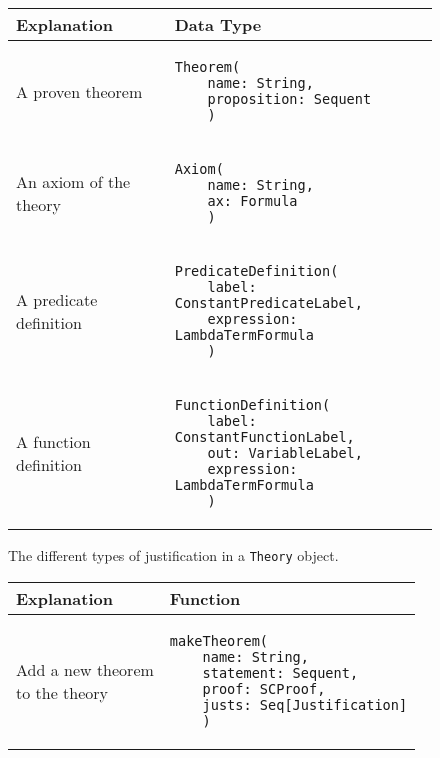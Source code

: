 {
\def\arraystretch{4}

\begin{figure}[hp]
\begin{center}
\begin{tabular}{l|l}
Explanation & Data Type
\\ \hline

A proven theorem & 
\begin{lstlisting}
Theorem(
	name: String,
	proposition: Sequent
	)

\end{lstlisting}
\\ %

An axiom of the theory & 
\begin{lstlisting}
Axiom(
	name: String,
	ax: Formula
	)

\end{lstlisting}
\\ %

A predicate definition & 
\begin{lstlisting}
PredicateDefinition(
	label: ConstantPredicateLabel,
	expression: LambdaTermFormula
	)

\end{lstlisting} 
\\ %

A function definition & 
\begin{lstlisting}
FunctionDefinition(
	label: ConstantFunctionLabel,
	out: VariableLabel,
	expression: LambdaTermFormula
	)

\end{lstlisting}
\\ %

\end{tabular}

\caption{The different types of justification in a \lstinline{Theory}{} object.}
\label{fig:justifications}
\end{center}
\end{figure}

\begin{figure}[hp]
\begin{center}
\begin{tabular}{l|l}
Explanation & Function
\\ \hline

\makecell[l]{Add a new theorem\\to the theory} & 
\begin{lstlisting}
makeTheorem(
	name: String,
	statement: Sequent,
	proof: SCProof,
	justs: Seq[Justification]
	)
\end{lstlisting}
\\ %


\end{tabular}
\end{center}
\end{figure}}
